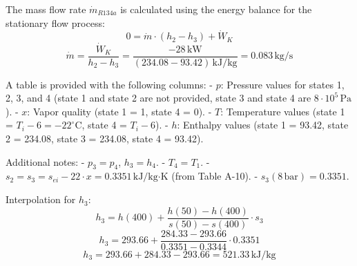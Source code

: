 The mass flow rate \( \dot{m}_{R134a} \) is calculated using the energy balance for the stationary flow process:  
\[ 0 = \dot{m} \cdot (h_2 - h_3) + \dot{W}_K \]  
\[ \dot{m} = \frac{\dot{W}_K}{h_2 - h_3} = \frac{-28 \, \text{kW}}{(234.08 - 93.42) \, \text{kJ/kg}} = 0.083 \, \text{kg/s} \]  

A table is provided with the following columns:  
- \( p \): Pressure values for states 1, 2, 3, and 4 (state 1 and state 2 are not provided, state 3 and state 4 are \( 8 \cdot 10^5 \, \text{Pa} \)).  
- \( x \): Vapor quality (state 1 = 1, state 4 = 0).  
- \( T \): Temperature values (state 1 = \( T_i - 6 = -22^\circ \text{C} \), state 4 = \( T_i - 6 \)).  
- \( h \): Enthalpy values (state 1 = 93.42, state 2 = 234.08, state 3 = 234.08, state 4 = 93.42).  

Additional notes:  
- \( p_3 = p_4 \), \( h_3 = h_4 \).  
- \( T_4 = T_1 \).  
- \( s_2 = s_3 = s_{ei} - 22 \cdot x = 0.3351 \, \text{kJ/kg·K} \) (from Table A-10).  
- \( s_3 (8 \, \text{bar}) = 0.3351 \).  

Interpolation for \( h_3 \):  
\[ h_3 = h(400) + \frac{h(50) - h(400)}{s(50) - s(400)} \cdot s_3 \]  
\[ h_3 = 293.66 + \frac{284.33 - 293.66}{0.3351 - 0.3344} \cdot 0.3351 \]  
\[ h_3 = 293.66 + 284.33 - 293.66 = 521.33 \, \text{kJ/kg} \]